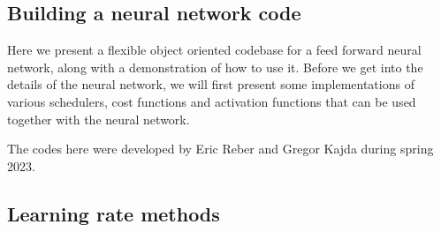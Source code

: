 \documentclass[%
oneside,                 %
final,                   %
10pt]{article}
\begin{document}
\subsection{Building a neural network code}

Here we  present a flexible object oriented codebase
for a feed forward neural network, along with a demonstration of how
to use it. Before we get into the details of the neural network, we
will first present some implementations of various schedulers, cost
functions and activation functions that can be used together with the
neural network.

The codes here were developed by Eric Reber and Gregor Kajda during spring 2023.

\subsection{Learning rate methods}
\end{document}
